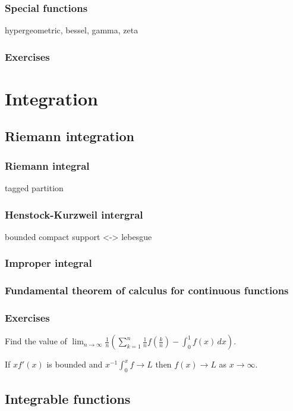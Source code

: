 \documentclass{../note}
\begin{document}
\section{Special functions}
hypergeometric, bessel, gamma, zeta

\section*{Exercises}



\part{Integration}

\chapter{Riemann integration}

\section{Riemann integral}
tagged partition
\section{Henstock-Kurzweil intergral}
bounded compact support <-> lebesgue
\section{Improper integral}
\section{Fundamental theorem of calculus for continuous functions}

\section*{Exercises}
\begin{prb}
Find the value of $\lim_{n\to\infty}\frac1n\left(\sum_{k=1}^n\frac1nf\left(\frac kn\right)-\int_0^1f(x)\,dx\right)$.
\end{prb}

\begin{prb}
If $xf'(x)$ is bounded and $x^{-1}\int_0^xf\to L$ then $f(x)\to L$ as $x\to\infty$.
\end{prb}


\chapter{Integrable functions}
\end{document}
